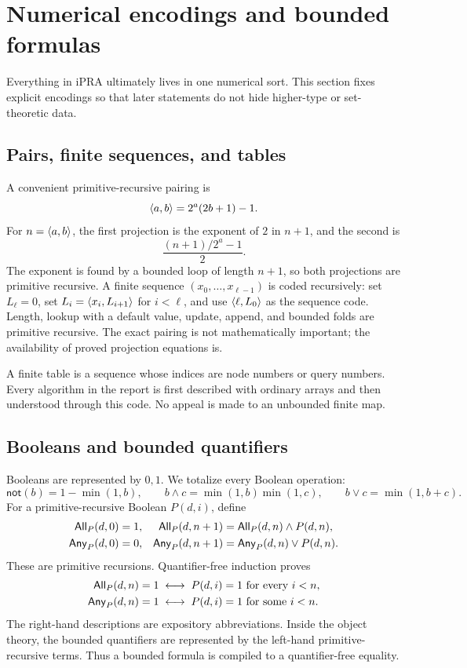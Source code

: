 \section{Numerical encodings and bounded formulas}

Everything in iPRA ultimately lives in one numerical sort.  This section
fixes explicit encodings so that later statements do not hide higher-type or
set-theoretic data.

\subsection{Pairs, finite sequences, and tables}

A convenient primitive-recursive pairing is
\[
   \langle a,b\rangle=2^a(2b+1)-1.
\]
For \(n=\langle a,b\rangle\), the first projection is the exponent of \(2\) in
\(n+1\), and the second is
\[
   \frac{(n+1)/2^a-1}{2}.
\]
The exponent is found by a bounded loop of length \(n+1\), so both projections
are primitive recursive.  A finite sequence
\((x_0,\ldots,x_{\ell-1})\) is coded recursively: set
\(L_{\ell}=0\), set \(L_i=\langle x_i,L_{i+1}\rangle\) for
\(i<\ell\), and use \(\langle \ell,L_0\rangle\) as the sequence code.
Length, lookup with a default value, update, append, and bounded folds are
primitive recursive.  The exact pairing is not mathematically important; the
availability of proved projection equations is.

A finite table is a sequence whose indices are node numbers or query numbers.
Every algorithm in the report is first described with ordinary arrays and
then understood through this code.  No appeal is made to an unbounded finite
map.

\subsection{Booleans and bounded quantifiers}

Booleans are represented by \(0,1\).  We totalize every Boolean operation:
\[
  \mathsf{not}(b)=1-\min(1,b),\qquad
  b\wedge c=\min(1,b)\min(1,c),\qquad
  b\vee c=\min(1,b+c).
\]
For a primitive-recursive Boolean \(P(d,i)\), define
\[
\begin{aligned}
 \mathsf{All}_P(d,0)&=1, &
 \mathsf{All}_P(d,n+1)&=\mathsf{All}_P(d,n)\wedge P(d,n),\\
 \mathsf{Any}_P(d,0)&=0, &
 \mathsf{Any}_P(d,n+1)&=\mathsf{Any}_P(d,n)\vee P(d,n).
\end{aligned}
\]
These are primitive recursions.  Quantifier-free induction proves
\[
\begin{aligned}
 \mathsf{All}_P(d,n)=1
 &\;\longleftrightarrow\; P(d,i)=1\text{ for every }i<n,\\
 \mathsf{Any}_P(d,n)=1
 &\;\longleftrightarrow\; P(d,i)=1\text{ for some }i<n.
\end{aligned}
\]
The right-hand descriptions are expository abbreviations.  Inside the object
theory, the bounded quantifiers are represented by the left-hand
primitive-recursive terms.  Thus a bounded formula is compiled to a
quantifier-free equality.


